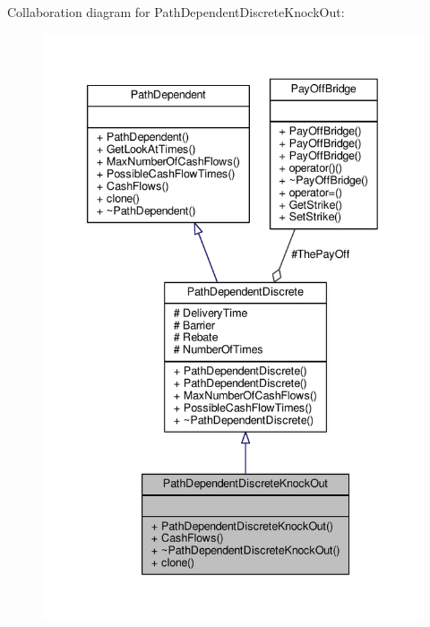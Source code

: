 Collaboration diagram for Path\+Dependent\+Discrete\+Knock\+Out\+:
\nopagebreak
\begin{figure}[H]
\begin{center}
\leavevmode
\includegraphics[width=340pt]{classPathDependentDiscreteKnockOut__coll__graph}
\end{center}
\end{figure}
